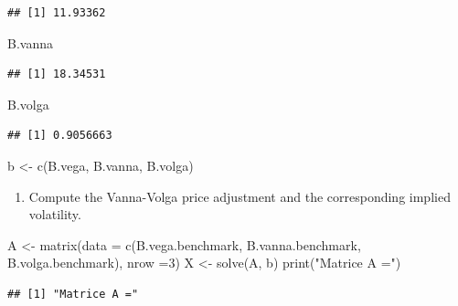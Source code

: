 \documentclass[
]{article}
\newenvironment{Shaded}{\begin{snugshade}}{\end{snugshade}}
\newcommand{\AttributeTok}[1]{\textcolor[rgb]{0.77,0.63,0.00}{#1}}
\newcommand{\DecValTok}[1]{\textcolor[rgb]{0.00,0.00,0.81}{#1}}
\newcommand{\FunctionTok}[1]{\textcolor[rgb]{0.00,0.00,0.00}{#1}}
\newcommand{\NormalTok}[1]{#1}
\newcommand{\OtherTok}[1]{\textcolor[rgb]{0.56,0.35,0.01}{#1}}
\newcommand{\StringTok}[1]{\textcolor[rgb]{0.31,0.60,0.02}{#1}}
\providecommand{\tightlist}{%
  \setlength{\itemsep}{0pt}\setlength{\parskip}{0pt}}
\begin{document}
\begin{verbatim}
## [1] 11.93362
\end{verbatim}

\begin{Shaded}
\begin{Highlighting}[]
\NormalTok{B.vanna}
\end{Highlighting}
\end{Shaded}

\begin{verbatim}
## [1] 18.34531
\end{verbatim}

\begin{Shaded}
\begin{Highlighting}[]
\NormalTok{B.volga}
\end{Highlighting}
\end{Shaded}

\begin{verbatim}
## [1] 0.9056663
\end{verbatim}

\begin{Shaded}
\begin{Highlighting}[]
\NormalTok{b }\OtherTok{\textless{}{-}} \FunctionTok{c}\NormalTok{(B.vega, B.vanna, B.volga)}
\end{Highlighting}
\end{Shaded}

\begin{enumerate}
\def\labelenumi{\arabic{enumi}.}
\setcounter{enumi}{4}
\tightlist
\item
  Compute the Vanna-Volga price adjustment and the corresponding implied
  volatility.
\end{enumerate}

\begin{Shaded}
\begin{Highlighting}[]
\NormalTok{A }\OtherTok{\textless{}{-}} \FunctionTok{matrix}\NormalTok{(}\AttributeTok{data =} \FunctionTok{c}\NormalTok{(B.vega.benchmark, B.vanna.benchmark, B.volga.benchmark), }\AttributeTok{nrow =}\DecValTok{3}\NormalTok{)}
\NormalTok{X }\OtherTok{\textless{}{-}} \FunctionTok{solve}\NormalTok{(A, b)}
\FunctionTok{print}\NormalTok{(}\StringTok{"Matrice A ="}\NormalTok{)}
\end{Highlighting}
\end{Shaded}

\begin{verbatim}
## [1] "Matrice A ="
\end{verbatim}
\end{document}

